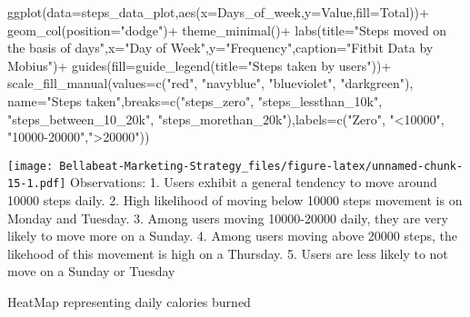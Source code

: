 \documentclass[
]{article}
\newenvironment{Shaded}{\begin{snugshade}}{\end{snugshade}}
\newcommand{\AttributeTok}[1]{\textcolor[rgb]{0.77,0.63,0.00}{#1}}
\newcommand{\FunctionTok}[1]{\textcolor[rgb]{0.00,0.00,0.00}{#1}}
\newcommand{\NormalTok}[1]{#1}
\newcommand{\SpecialCharTok}[1]{\textcolor[rgb]{0.00,0.00,0.00}{#1}}
\newcommand{\StringTok}[1]{\textcolor[rgb]{0.31,0.60,0.02}{#1}}
\begin{document}
\begin{Shaded}
\begin{Highlighting}[]
\FunctionTok{ggplot}\NormalTok{(}\AttributeTok{data=}\NormalTok{steps\_data\_plot,}\FunctionTok{aes}\NormalTok{(}\AttributeTok{x=}\NormalTok{Days\_of\_week,}\AttributeTok{y=}\NormalTok{Value,}\AttributeTok{fill=}\NormalTok{Total))}\SpecialCharTok{+}
  \FunctionTok{geom\_col}\NormalTok{(}\AttributeTok{position=}\StringTok{"dodge"}\NormalTok{)}\SpecialCharTok{+}
  \FunctionTok{theme\_minimal}\NormalTok{()}\SpecialCharTok{+}
  \FunctionTok{labs}\NormalTok{(}\AttributeTok{title=}\StringTok{"Steps moved on the basis of days"}\NormalTok{,}\AttributeTok{x=}\StringTok{"Day of Week"}\NormalTok{,}\AttributeTok{y=}\StringTok{"Frequency"}\NormalTok{,}\AttributeTok{caption=}\StringTok{"Fitbit Data by Mobius"}\NormalTok{)}\SpecialCharTok{+}
  \FunctionTok{guides}\NormalTok{(}\AttributeTok{fill=}\FunctionTok{guide\_legend}\NormalTok{(}\AttributeTok{title=}\StringTok{"Steps taken by users"}\NormalTok{))}\SpecialCharTok{+}
  \FunctionTok{scale\_fill\_manual}\NormalTok{(}\AttributeTok{values=}\FunctionTok{c}\NormalTok{(}\StringTok{"red"}\NormalTok{, }\StringTok{"navyblue"}\NormalTok{, }\StringTok{"blueviolet"}\NormalTok{, }\StringTok{"darkgreen"}\NormalTok{), }\AttributeTok{name=}\StringTok{"Steps taken"}\NormalTok{,}\AttributeTok{breaks=}\FunctionTok{c}\NormalTok{(}\StringTok{"steps\_zero"}\NormalTok{, }\StringTok{"steps\_lessthan\_10k"}\NormalTok{, }\StringTok{"steps\_between\_10\_20k"}\NormalTok{, }\StringTok{"steps\_morethan\_20k"}\NormalTok{),}\AttributeTok{labels=}\FunctionTok{c}\NormalTok{(}\StringTok{"Zero"}\NormalTok{, }\StringTok{"\textless{}10000"}\NormalTok{, }\StringTok{"10000{-}20000"}\NormalTok{,}\StringTok{"\textgreater{}20000"}\NormalTok{))}
\end{Highlighting}
\end{Shaded}

\texttt{[image: Bellabeat-Marketing-Strategy\_files/figure-latex/unnamed-chunk-15-1.pdf]}
Observations: 1. Users exhibit a general tendency to move around 10000
steps daily. 2. High likelihood of moving below 10000 steps movement is
on Monday and Tuesday. 3. Among users moving 10000-20000 daily, they are
very likely to move more on a Sunday. 4. Among users moving above 20000
steps, the likehood of this movement is high on a Thursday. 5. Users are
less likely to not move on a Sunday or Tuesday

HeatMap representing daily calories burned
\end{document}
